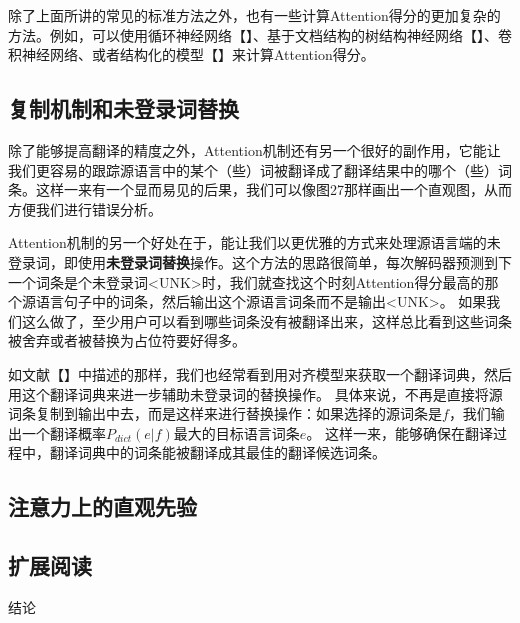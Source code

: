 \documentclass[10pt,a4paper]{ctexart}
\makeatletter
\renewcommand{\section}{\@startsection{section}{1}{0mm}
  {-\baselineskip}{0.5\baselineskip}{\bf\leftline}}
\makeatother
\begin{document}
除了上面所讲的常见的标准方法之外，也有一些计算Attention得分的更加复杂的方法。例如，可以使用循环神经网络【】、基于文档结构的树结构神经网络【】、卷积神经网络、或者结构化的模型【】来计算Attention得分。

\subsection{复制机制和未登录词替换}
除了能够提高翻译的精度之外，Attention机制还有另一个很好的副作用，它能让我们更容易的跟踪源语言中的某个（些）词被翻译成了翻译结果中的哪个（些）词条。这样一来有一个显而易见的后果，我们可以像图27那样画出一个直观图，从而方便我们进行错误分析。

Attention机制的另一个好处在于，能让我们以更优雅的方式来处理源语言端的未登录词，即使用\textbf{未登录词替换}操作。这个方法的思路很简单，每次解码器预测到下一个词条是个未登录词<UNK>时，我们就查找这个时刻Attention得分最高的那个源语言句子中的词条，然后输出这个源语言词条而不是输出<UNK>。
如果我们这么做了，至少用户可以看到哪些词条没有被翻译出来，这样总比看到这些词条被舍弃或者被替换为占位符要好得多。

如文献【】中描述的那样，我们也经常看到用对齐模型来获取一个翻译词典，然后用这个翻译词典来进一步辅助未登录词的替换操作。
具体来说，不再是直接将源词条复制到输出中去，而是这样来进行替换操作：如果选择的源词条是$f$，我们输出一个翻译概率$P_{dict}(e|f)$最大的目标语言词条$e$。
这样一来，能够确保在翻译过程中，翻译词典中的词条能被翻译成其最佳的翻译候选词条。

\subsection{注意力上的直观先验}


\subsection{扩展阅读}


\section{结论}
\end{document}
